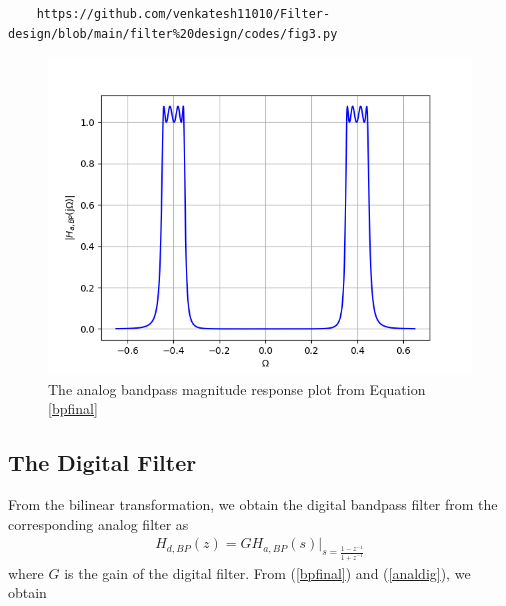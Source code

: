 \documentclass{article}
\begin{document}
\begin{lstlisting}
	https://github.com/venkatesh11010/Filter-design/blob/main/filter%20design/codes/fig3.py
\end{lstlisting}
\begin{figure}[H]
\includegraphics[width = \columnwidth]{figs/fig3.png}
\caption{The analog bandpass magnitude response plot from Equation \ref{bpfinal}} 
\label{fig4}
\end{figure}

\subsection{The Digital Filter}
From the bilinear transformation, we obtain the digital bandpass filter from the corresponding analog filter as
\begin{eqnarray}
\label{analdig}
H_{d,BP}(z) = GH_{a,BP}(s)\vert_{s = \frac{1-z^{-1}}{1 + z^{-1}}}
\end{eqnarray}
where $G$ is the gain of the digital filter.  From (\ref{bpfinal}) and (\ref{analdig}), we obtain
\end{document}
